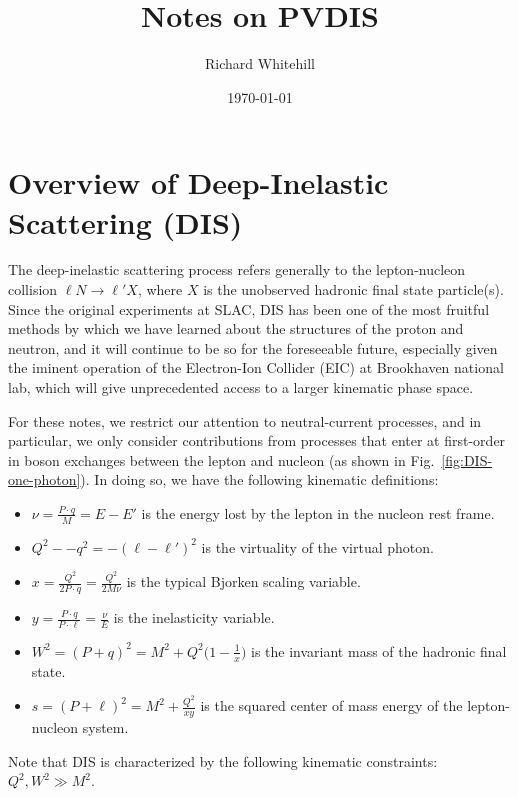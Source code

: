 \documentclass[aps,prd,amsmath,superscriptaddress,floatfix,nofootinbib]{revtex4-2}
\newcommand{\fref}[1]{Fig.~\ref{fig:#1}}
\begin{document}
\title{Notes on PVDIS}
\author{Richard Whitehill}
\date{\today}
\maketitle

\section{Overview of Deep-Inelastic Scattering (DIS)}
\label{sec:overview-of-deep-inelastic-scattering}

The deep-inelastic scattering process refers generally to the lepton-nucleon collision $\ell N \rightarrow \ell' X$, where $X$ is the unobserved hadronic final state particle(s).
Since the original experiments at SLAC, DIS has been one of the most fruitful methods by which we have learned about the structures of the proton and neutron, and it will continue to be so for the foreseeable future, especially given the iminent operation of the Electron-Ion Collider (EIC) at Brookhaven national lab, which will give unprecedented access to a larger kinematic phase space.

For these notes, we restrict our attention to neutral-current processes, and in particular, we only consider contributions from processes that enter at first-order in boson exchanges between the lepton and nucleon (as shown in \fref{DIS-one-photon}).
In doing so, we have the following kinematic definitions:
\begin{itemize}
    \item $\displaystyle \nu = \frac{P \cdot q}{M} = E - E'$ is the energy lost by the lepton in the nucleon rest frame.
    \item $Q^2 - -q^2 = -(\ell - \ell')^2$ is the virtuality of the virtual photon.
    \item $\displaystyle x = \frac{Q^2}{2 P \cdot q} = \frac{Q^2}{2 M \nu}$ is the typical Bjorken scaling variable.
    \item $\displaystyle y = \frac{P \cdot q}{P \cdot \ell} = \frac{\nu}{E}$ is the inelasticity variable.
    \item $\displaystyle W^2 = (P + q)^2 = M^2 + Q^2 \Big( 1 - \frac{1}{x} \Big)$ is the invariant mass of the hadronic final state.
    \item $\displaystyle s = (P + \ell)^2 = M^2 + \frac{Q^2}{xy}$ is the squared center of mass energy of the lepton-nucleon system.
\end{itemize}
Note that DIS is characterized by the following kinematic constraints: $Q^2, W^2 \gg M^2$.
\end{document}
